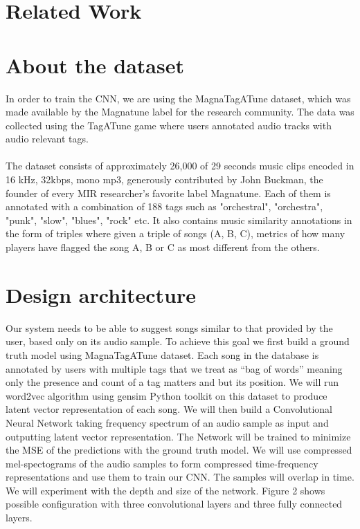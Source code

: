 \documentclass[11pt, a4paper]{article}
\begin{document}
  \section{Related Work}
  \section{About the dataset}
    In order to train the CNN, we are using the MagnaTagATune dataset, which
    was made available by the Magnatune label for the research community. The
    data was collected using the TagATune game where users annotated audio
    tracks with audio relevant tags.
    \\ \\
    \noindent
    The dataset consists of approximately 26,000 of 29 seconds music clips
    encoded in 16 kHz, 32kbps, mono mp3, generously contributed by John
    Buckman, the founder of every MIR researcher's favorite label Magnatune.
    Each of them is annotated with a combination of 188 tags such as
    "orchestral", "orchestra", "punk", "slow", "blues", "rock" etc. It also
    contains music similarity annotations in the form of triples where given a
    triple of songs (A, B, C), metrics of how many players have flagged the
    song A, B or C as most different from the others. \cite{msd-dataset}

  \section{Design architecture}
    Our system needs to be able to suggest songs similar to that provided by
    the user, based only on its audio sample. To achieve this goal we first
    build a ground truth model using MagnaTagATune dataset. Each song in the
    database is annotated by users with multiple tags that we treat as ``bag of
    words'' meaning only the presence and count of a tag matters and but its
    position. We will run word2vec algorithm using gensim Python toolkit on
    this dataset to produce latent vector representation of each song. We will
    then build a Convolutional Neural Network taking frequency spectrum of an
    audio sample as input and outputting latent vector representation. The
    Network will be trained to minimize the MSE of the predictions with the
    ground truth model. We will use compressed mel-spectograms of the audio
    samples to form compressed time-frequency representations and use them to
    train our CNN. The samples will overlap in time. We will experiment with
    the depth and size of the network. Figure 2 shows possible configuration
    with three convolutional layers and three fully connected layers.
\end{document}
